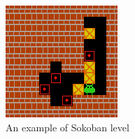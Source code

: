 \begin{figure}[H]
\includegraphics[]{figures/Sokoban.png}
\caption[Sokoban]{An example of Sokoban level}
\label{Fig.Sokoban}
\end{figure}
